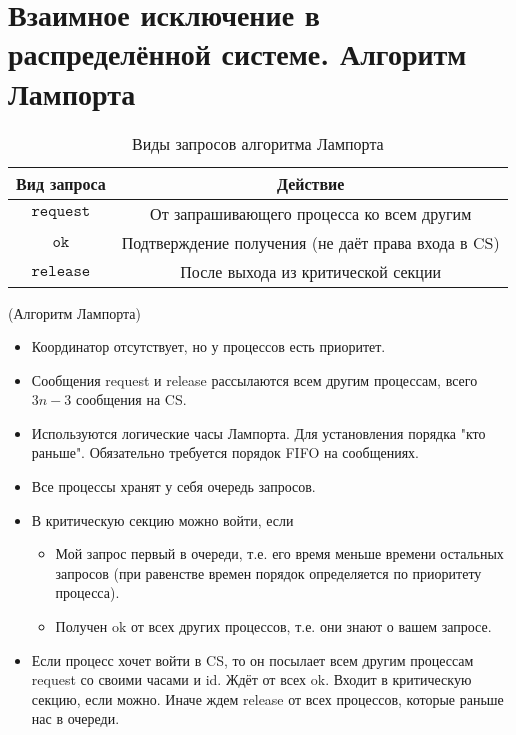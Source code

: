 \section{Взаимное исключение в распределённой системе. Алгоритм Лампорта}

\begin{table}[!ht]
    \centering
    \begin{tabular}{|c|c|} \hline
        Вид запроса & Действие \\ \hline
        $\texttt{request}$ & От запрашивающего процесса ко всем другим\\ \hline
        $\texttt{ok}$ & Подтверждение получения (не даёт права входа в CS) \\ \hline
        $\texttt{release}$ & После выхода из критической секции \\\hline
    \end{tabular}
    \caption{Виды запросов алгоритма Лампорта}
\end{table}

\begin{algorithm}(Алгоритм Лампорта)
\begin{itemize}
    \item Координатор отсутствует, но у процессов есть приоритет.
    \item Сообщения request и release рассылаются всем другим процессам, всего $3n-3$ сообщения на CS.
    \item Используются логические часы Лампорта.
        Для установления порядка "кто раньше".
        Обязательно требуется порядок FIFO на сообщениях.
    \item Все процессы хранят у себя очередь запросов.
    \item В критическую секцию можно войти, если
        \begin{itemize}
            \item Мой запрос первый в очереди, т.е. его время меньше времени 
                остальных запросов (при равенстве времен порядок определяется 
                по приоритету процесса).
            \item Получен ok от всех других процессов, т.е. они знают о вашем запросе.
        \end{itemize}
    \item Если процесс хочет войти в CS, то он посылает всем другим процессам request со
        своими часами и id. Ждёт от всех ok. Входит в критическую секцию, если можно.
        Иначе ждем release от всех процессов, которые раньше нас в очереди.
\end{itemize}
\end{algorithm}

